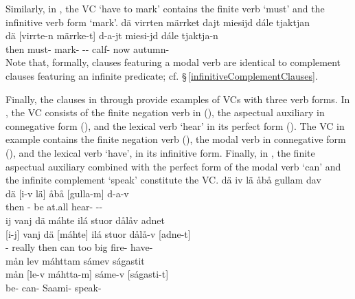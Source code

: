 Similarly, in , the VC  ‘have to mark’ contains the finite verb  ‘must’ and the infinitive verb form  ‘mark’. 
\ea\label{VCex5a}
\glll	dä virrten märrket dajt miesijd dále tjaktjan\\
	dä {[virrte-n} {märrke-t]\subVC} d-a-jt miesi-jd dále tjaktja-n\\
	then must- mark- -- calf- now autumn-\\\nopagebreak
{}	
\z
Note that, formally, clauses featuring a modal verb are identical to complement clauses featuring an infinite predicate; cf. §\,\ref{infinitiveComplementClauses}. 

Finally, the clauses in  through  provide examples of VCs with three verb forms. In , the VC consists of the finite negation verb in  (), the aspectual auxiliary  in connegative form (), and the lexical verb  ‘hear’ in its perfect form (). The VC in example  contains the finite negation verb  (), the modal verb  in connegative form (), and the lexical verb  ‘have’, in its infinitive form. Finally, in , the finite aspectual auxiliary  combined with the perfect form of the modal verb  ‘can’ and the infinite complement  ‘speak’ constitute the VC.
\ea\label{VCex6}
\glll	dä iv lä åbå gullam dav\\
	dä [i-v {lä]\subVC} åbå {[gulla-m]\subVC} d-a-v\\
	then - be\BS{} at.all hear- --\\\nopagebreak
{}	
\z
\ea\label{VCex7}
\glll	ij vanj dä máhte ilá stuor dålåv adnet\\
	{[i-j]\subVC} vanj dä {[máhte]\subVC} ilá stuor dålå-v {[adne-t]\subVC}\\
	- really then can\BS{} too big fire- have-\\\nopagebreak
{}	
\z
\ea\label{VCex8}
\glll	mån lev máhttam sámev ságastit\\
	mån {[le-v} {máhtta-m]\subVC} sáme-v {[ságasti-t]\subVC}\\
	 be- can- Saami- speak-\\\nopagebreak
{}	
\z


